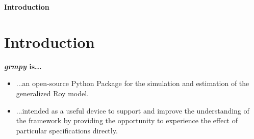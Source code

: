 \begin{frame}\begin{center}
\LARGE\textbf{Introduction}
\end{center}\end{frame}

\section{Introduction}

\begin{frame}
\textbf{\textit{grmpy} is...}

\bigskip
   \begin{itemize}\setlength\itemsep{1em}
      \item ...an open-source Python Package for the simulation and estimation of the generalized Roy model.
      
      \medskip
      \item ...intended as a useful device to support and improve the understanding of the framework by providing the opportunity to experience the effect of particular specifications directly.
    \end{itemize}

\end{frame}
